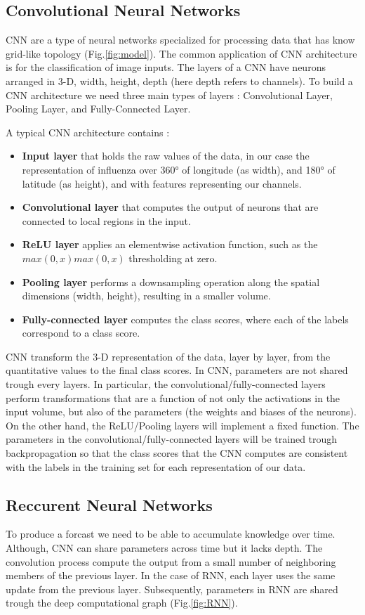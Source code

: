 \documentclass[12pt]{article}
\begin{document}
\subsection{Convolutional Neural Networks}
CNN are a type of neural networks specialized for processing data  that has know grid-like topology (Fig.\ref{fig:model}). The common application of CNN architecture is for the classification of image inputs. The layers of a CNN have neurons arranged in 3-D, width, height, depth (here depth refers to channels). To build a CNN architecture we need three main types of layers : Convolutional Layer, Pooling Layer, and Fully-Connected Layer.

A typical CNN architecture contains :
\begin{itemize}
\item \textbf{Input layer} that holds the raw values of the data, in our case the representation of influenza over 360° of longitude (as width),  and 180° of latitude (as height), and with features representing our channels.
\item \textbf{Convolutional layer} that computes the output of neurons that are connected to local regions in the input. 
\item \textbf{ReLU layer} applies an elementwise activation function, such as the $max(0,x)max(0,x)$ thresholding at zero.
\item \textbf{Pooling layer} performs a downsampling operation along the spatial dimensions (width, height), resulting in a smaller volume.
\item \textbf{Fully-connected layer} computes the class scores, where each of the labels correspond to a class score.
\end{itemize}
CNN transform the 3-D representation of the data, layer by layer, from the quantitative values to the final class scores. In CNN, parameters are not shared trough every layers. In particular, the convolutional/fully-connected layers perform transformations that are a function of not only the activations in the input volume, but also of the parameters (the weights and biases of the neurons). On the other hand, the ReLU/Pooling layers will implement a fixed function. The parameters in the convolutional/fully-connected layers will be trained trough backpropagation so that the class scores that the CNN computes are consistent with the labels in the training set for each representation of our data.

\subsection{Reccurent Neural Networks}
To produce a forcast we need to be able to accumulate knowledge over time. Although, CNN can share parameters across time but it lacks depth. The convolution process compute the output from a small number of neighboring members of the previous layer. In the case of RNN, each layer uses the same update from the previous layer. Subsequently, parameters in RNN are shared trough the deep computational graph (Fig.\ref{fig:RNN}).
\end{document}

